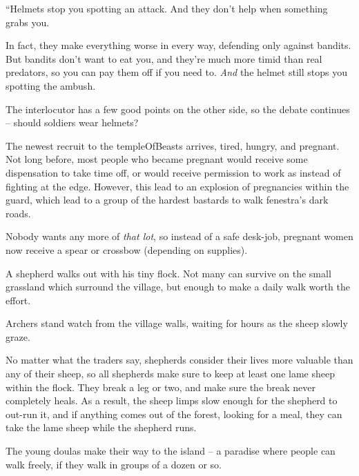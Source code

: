 \begin{multicols}{2}
\begin{exampletext}
  \begin{speechtext}
    ``Helmets stop you spotting an attack.
    And they don't help when something grabs you.

    In fact, they make everything worse in every way, defending only against bandits.
    But bandits don't want to eat you, and they're much more timid than real predators, so you can pay them off if you need to.
    \emph{And} the helmet still stops you spotting the ambush.
  \end{speechtext}

  The interlocutor has a few good points on the other side, so the debate continues -- should soldiers wear helmets?
\end{exampletext}

\begin{exampletext}
  The newest recruit to the \gls{templeOfBeasts} arrives, tired, hungry, and pregnant.
  Not long before, most people who became pregnant would receive some dispensation to take time off, or would receive permission to work as  instead of fighting at the \gls{edge}.
  However, this lead to an explosion of pregnancies within the \gls{guard}, which lead to a group of the hardest bastards to walk \gls{fenestra}'s dark roads.

  Nobody wants any more of \emph{that lot}, so instead of a safe desk-job, pregnant women now receive a spear or crossbow (depending on supplies).
\end{exampletext}

\begin{exampletext}
  A shepherd walks out with his tiny flock.
  Not many can survive on the small grassland which surround the \gls{village}, but enough to make a daily walk worth the effort.

  Archers stand watch from the \gls{village} walls, waiting for hours as the sheep slowly graze.

  No matter what the traders say, shepherds consider their lives more valuable than any of their sheep, so all shepherds make sure to keep at least one lame sheep within the flock.
  They break a leg or two, and make sure the break never completely heals.
  As a result, the sheep limps slow enough for the shepherd to out-run it, and if anything comes out of the forest, looking for a meal, they can take the lame sheep while the shepherd runs.
\end{exampletext}

\begin{exampletext}
  The young \glspl{doula} make their way to the island -- a paradise where people can walk freely, if they walk in groups of a dozen or so.


\end{exampletext}
\end{multicols}
